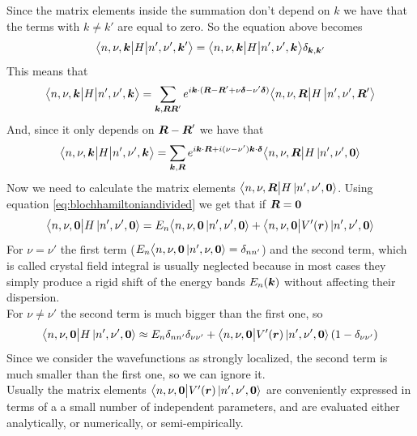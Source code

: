 Since the matrix elements inside the summation don't depend on $k$ we have that the terms with $k\neq k'$ are equal to zero. So the equation above becomes
\[
    \big\langle n,\nu,\boldsymbol{k}\big|H\big| n',\nu',\boldsymbol{k}'\big\rangle= 
    \big\langle n,\nu,\boldsymbol{k}\big|H\big| n',\nu',\boldsymbol{k}\big\rangle\delta_{\boldsymbol{k},\boldsymbol{k}'}
\]
This means that 
\[
    \big\langle n,\nu,\boldsymbol{k}\big|H\big| n',\nu',\boldsymbol{k}\big\rangle=
    \sum_{\boldsymbol{k},\boldsymbol{R}\boldsymbol{R}'}
    e^{i\boldsymbol{k}\cdot (\boldsymbol{R}-\boldsymbol{R}' +\nu\boldsymbol \delta-\nu'\boldsymbol\delta)}
    \big\langle n,\nu,\boldsymbol{R}\big|H\ket{n',\nu',\boldsymbol{R}'}
\]
And, since it only depends on $\boldsymbol{R}-\boldsymbol{R}'$ we have that
\begin{equation}
    \label{eq:boh0}
    \big\langle n,\nu,\boldsymbol{k}\big|H\big| n',\nu',\boldsymbol{k}\big\rangle=
    \sum_{\boldsymbol{k},\boldsymbol{R}}
    e^{i\boldsymbol{k}\cdot \boldsymbol{R} + i(\nu-\nu')\boldsymbol{k}\cdot \boldsymbol \delta}
    \big\langle n,\nu,\boldsymbol{R}\big|H\ket{n',\nu',\boldsymbol{0}}
\end{equation}
Now we need to calculate the matrix elements $ \big\langle n,\nu,\boldsymbol{R}\big|H\ket{n',\nu',\boldsymbol{0}}$. Using equation \ref{eq:blochhamiltoniandivided} we get that if $\boldsymbol{R}=\boldsymbol{0}$
\begin{equation}
    \big\langle n,\nu,\boldsymbol{0}\big|H\ket{n',\nu',\boldsymbol{0}}
    =E_n\big\langle n,\nu,\boldsymbol{0}\ket{n',\nu',\boldsymbol{0}}+
    \big\langle n,\nu,\boldsymbol{0}\big|V'(\boldsymbol{r})\ket{n',\nu',\boldsymbol{0}}
\end{equation}
For $\nu=\nu'$ the first term ($E_n\big\langle n,\nu,\boldsymbol{0}\ket{n',\nu,\boldsymbol{0}}=\delta_{nn'}$) and the second term, which is called crystal field integral is usually neglected because in most cases they simply produce a rigid shift of the energy bands $E_n(\boldsymbol{k})$ without affecting their dispersion. \cite{grosso2013solid}\\
For $\nu\neq\nu'$ the second term is much bigger than the first one, so
\begin{equation}
    \big\langle n,\nu,\boldsymbol{0}\big|H\ket{n',\nu',\boldsymbol{0}}
    \approx E_n\delta_{nn'}\delta_{\nu\nu'}+
    \big\langle n,\nu,\boldsymbol{0}\big|V'(\boldsymbol{r})\ket{n',\nu',\boldsymbol{0}}(1-\delta_{\nu\nu'})
    \label{eq:tight1}
\end{equation}
Since we consider the wavefunctions as strongly localized, the second term is much smaller than the first one, so we can ignore it.\\
Usually the matrix elements $\big\langle n,\nu,\boldsymbol{0}\big|V'(\boldsymbol{r})\ket{n',\nu',\boldsymbol{0}}$ are conveniently expressed in terms of a a small number of independent parameters, and are evaluated either analytically, or numerically, or semi-empirically. 
\renewcommand{\arraystretch}{1.5}


